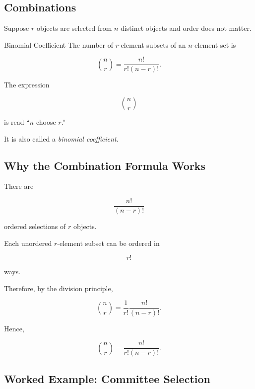 \subsection{Combinations}
\label{subsec:combinations}

Suppose \(r\) objects are selected from \(n\) distinct objects and order
does not matter.

\begin{definitionbox}{Binomial Coefficient}
The number of \(r\)-element subsets of an \(n\)-element set is

\[
\boxed{
\binom{n}{r}
=
\frac{n!}{r!(n-r)!}.
}
\]
\end{definitionbox}

The expression

\[
\binom{n}{r}
\]

is read ``\(n\) choose \(r\).''

It is also called a \emph{binomial coefficient}.

\subsection{Why the Combination Formula Works}
\label{subsec:why-combination-formula}

There are

\[
\frac{n!}{(n-r)!}
\]

ordered selections of \(r\) objects.

Each unordered \(r\)-element subset can be ordered in

\[
r!
\]

ways.

Therefore, by the division principle,

\[
\binom{n}{r}
=
\frac{1}{r!}
\frac{n!}{(n-r)!}.
\]

Hence,

\[
\boxed{
\binom{n}{r}
=
\frac{n!}{r!(n-r)!}.
}
\]

\subsection{Worked Example: Committee Selection}
\label{subsec:worked-committee-selection}

